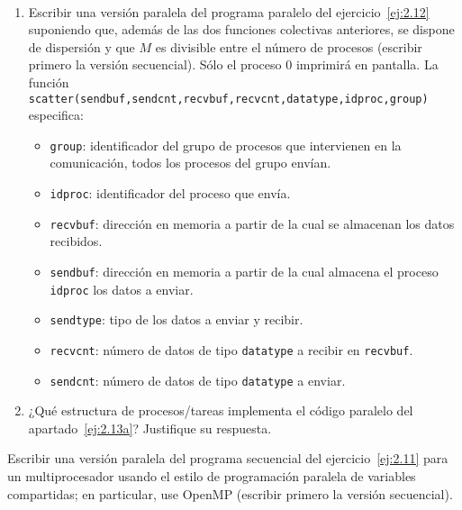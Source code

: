 \begin{ejercicio}~
    \begin{enumerate}
        \item\label{ej:2.13a} Escribir una versión paralela del programa paralelo del ejercicio~\ref{ej:2.12} suponiendo que, además de las
        dos funciones colectivas anteriores, se dispone de dispersión y que $M$ es divisible entre el número de
        procesos (escribir primero la versión secuencial). Sólo el proceso 0 imprimirá en pantalla. La función
        \verb|scatter(sendbuf,sendcnt,recvbuf,recvcnt,datatype,idproc,group)| especifica:
        \begin{itemize}
            \item \verb|group|: identificador del grupo de procesos que intervienen en la comunicación, todos los procesos
            del grupo envían.
            \item \verb|idproc|: identificador del proceso que envía.
            \item \verb|recvbuf|: dirección en memoria a partir de la cual se almacenan los datos recibidos.
            \item \verb|sendbuf|: dirección en memoria a partir de la cual almacena el proceso \verb|idproc| los datos a enviar.
            \item \verb|sendtype|: tipo de los datos a enviar y recibir.
            \item \verb|recvcnt|: número de datos de tipo \verb|datatype| a recibir en \verb|recvbuf|.
            \item \verb|sendcnt|: número de datos de tipo \verb|datatype| a enviar.
        \end{itemize}

        \item ¿Qué estructura de procesos/tareas implementa el código paralelo del apartado~\ref{ej:2.13a}? Justifique su respuesta.
    \end{enumerate}
\end{ejercicio}

\begin{ejercicio}
    Escribir una versión paralela del programa secuencial del ejercicio~\ref{ej:2.11} para un multiprocesador
    usando el estilo de programación paralela de variables compartidas; en particular, use OpenMP (escribir
    primero la versión secuencial).
\end{ejercicio}

